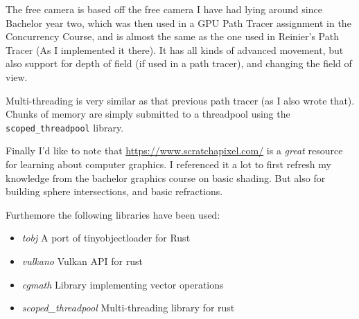 \documentclass{article}
\begin{document}
The free camera is based off the free camera I have had lying around since
Bachelor year two, which was then used in a GPU Path Tracer assignment in the
Concurrency Course, and is almost the same as the one used in Reinier's Path
Tracer (As I implemented it there). It has all kinds of advanced movement, but
also support for depth of field (if used in a path tracer), and changing the
field of view.

Multi-threading is very similar as that previous path tracer (as I also wrote
that). Chunks of memory are simply submitted to a threadpool using the
\texttt{scoped\_threadpool} library.

Finally I'd like to note that \url{https://www.scratchapixel.com/} is a
\emph{great} resource for learning about computer graphics.  I referenced it a
lot to first refresh my knowledge from the bachelor graphics course on basic
shading.  But also for building sphere intersections, and basic refractions.

Furthemore the following libraries have been used:
\begin{itemize}
  \item \emph{tobj} A port of tinyobjectloader for Rust
  \item \emph{vulkano} Vulkan API for rust
  \item \emph{cgmath} Library implementing vector operations
  \item \emph{scoped\_threadpool} Multi-threading library for rust
\end{itemize}
\end{document}
